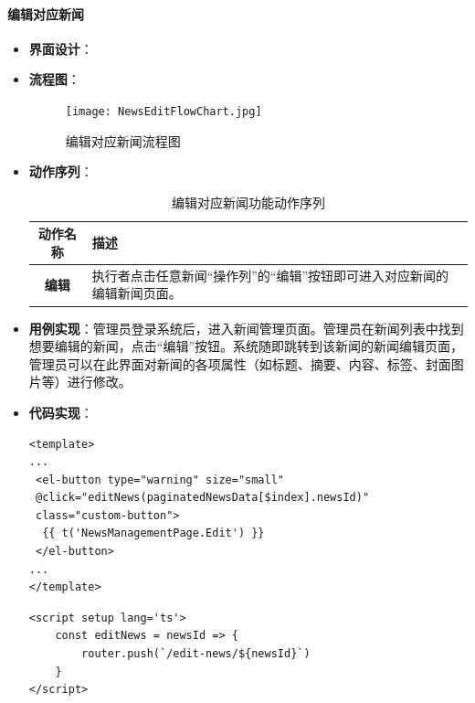 \paragraph{编辑对应新闻}
\begin{itemize}
	\item \textbf{界面设计}：
	\item \textbf{流程图}：
	\begin{figure}[H]
		\centering
		\texttt{[image: NewsEditFlowChart.jpg]}
		\caption{编辑对应新闻流程图}
		\label{NewsEditFlowChart}
	\end{figure}
	\item \textbf{动作序列}：
	\begin{table}[H]
		\centering
		\caption{编辑对应新闻功能动作序列}
		\renewcommand\arraystretch{1.5}
		\begin{tabular}{|c|>{\raggedright\arraybackslash}p{10cm}|}
			\hline
			\textbf{动作名称} & \textbf{描述} \\ \hline
			\textbf{编辑} & 执行者点击任意新闻“操作列”的“编辑”按钮即可进入对应新闻的编辑新闻页面。 \\ \hline
		\end{tabular}
	\end{table}
	\item \textbf{用例实现}：管理员登录系统后，进入新闻管理页面。管理员在新闻列表中找到想要编辑的新闻，点击“编辑”按钮。系统随即跳转到该新闻的新闻编辑页面，管理员可以在此界面对新闻的各项属性（如标题、摘要、内容、标签、封面图片等）进行修改。
	\item \textbf{代码实现}：
	\begin{verbatim}
<template>
...
 <el-button type="warning" size="small" 
 @click="editNews(paginatedNewsData[$index].newsId)" 
 class="custom-button">
  {{ t('NewsManagementPage.Edit') }}
 </el-button>
...
</template>
	\end{verbatim}
	
	\begin{verbatim}
<script setup lang='ts'>
	const editNews = newsId => {
		router.push(`/edit-news/${newsId}`)
	}
</script>
	\end{verbatim}
\end{itemize}


